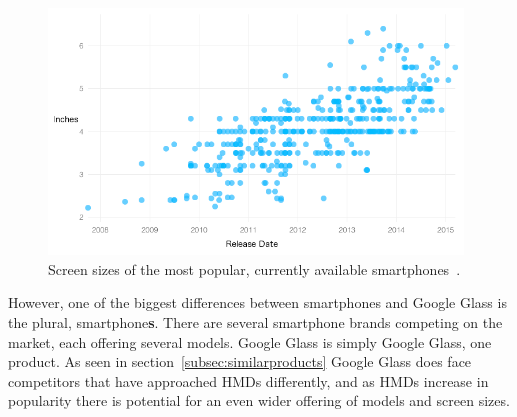 	
	\begin{figure}[ht!]
		\centering
		\includegraphics[width=110mm]{images/smartphoneSize}
		\caption{Screen sizes of the most popular, currently available smartphones~\cite{smartphoneSizeChart}.}
		\label{smartphoneSizeChart}
	\end{figure}

However, one of the biggest differences between smartphones and Google Glass is the plural, smartphone\textbf{s}. There are several smartphone brands competing on the market, each offering several models. Google Glass is simply Google Glass, one product. As seen in section~\ref{subsec:similarproducts} Google Glass does face competitors that have approached HMDs differently, and as HMDs increase in popularity there is potential for an even wider offering of models and screen sizes.








